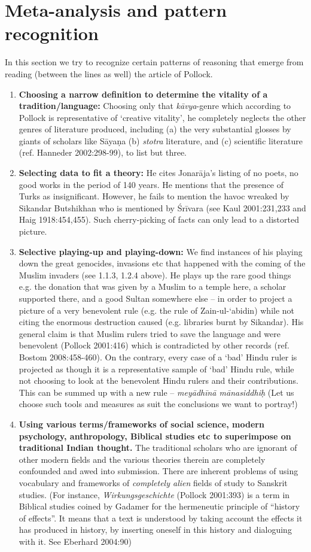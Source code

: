 \section{Meta-analysis and pattern recognition}

In this section we try to recognize certain patterns of reasoning that emerge from reading (between the lines as well) the article of Pollock.
\begin{enumerate}
\item {\bf Choosing a narrow definition to determine the vitality of a tradition/language:} Choosing only that {\sl kāvya}-genre which according to Pollock is representative of ‘creative vitality’, he completely neglects the other genres of literature produced, including (a) the very substantial glosses by giants of scholars like Sāyaṇa (b) {\sl stotra} literature, and (c) scientific literature (ref. Hanneder 2002:298-99), to list but three.
\item {\bf Selecting data to fit a theory:} He cites Jonarāja’s listing of no poets, no good works in the period of 140 years. He mentions that the presence of Turks as insignificant. However, he fails to mention the havoc wreaked by Sikandar Butshikhan who is mentioned by Śrīvara (see Kaul 2001:231,233 and Haig 1918:454,455). Such cherry-picking of facts can only lead to a distorted picture.
\item {\bf Selective playing-up and playing-down:} We find instances of his playing down the great genocides, invasions etc that happened with the coming of the Muslim invaders (see 1.1.3, 1.2.4 above). He plays up the rare good things  e.g. the donation that was given by a Muslim to a temple here, a scholar supported there, and a good Sultan somewhere else – in order to project a picture of a very benevolent rule (e.g. the rule of Zain-ul-‘abidin) while not citing the enormous destruction caused (e.g. libraries burnt by Sikandar). His general claim is that Muslim rulers tried to save the language and were benevolent (Pollock 2001:416) which is contradicted by other records (ref. Bostom 2008:458-460). On the contrary, every case of a ‘bad’ Hindu ruler is projected as though it is a representative sample of ‘bad’ Hindu rule, while not choosing to look at the benevolent Hindu rulers and their contributions. This can be summed up with a new rule – {\sl meyādhīnā mānasiddhiḥ} (Let us choose such tools and measures as suit the conclusions we want to portray!)
\item {\bf Using various terms/frameworks of social science, modern psychology, anthropology, Biblical studies etc to superimpose on traditional Indian thought.} The traditional scholars who are ignorant of other modern fields and the various theories therein are completely confounded and awed into submission. There are inherent problems of using vocabulary and frameworks of {\sl completely alien} fields of study to Sanskrit studies. (For instance, {\sl Wirkungsgeschichte} (Pollock 2001:393) is a term in Biblical studies coined by Gadamer for the hermeneutic principle of “history of effects”. It means that a text is understood by taking account the effects it has produced in history, by inserting oneself in this history and dialoguing with it. See Eberhard 2004:90)

\end{enumerate}
